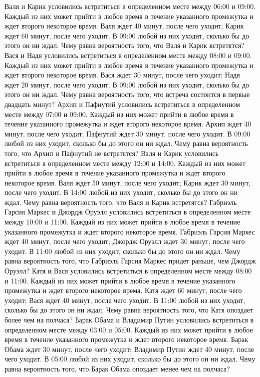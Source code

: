 Валя и Карик условились встретиться в определенном месте между 06:00 и 09:00. Каждый из них может прийти в любое время в течение указанного промежутка и ждет второго некоторое время. Валя ждет 40 минут, после чего уходит; Карик ждет 60 минут, после чего уходит. В 09:00 любой из них уходит, сколько бы до этого он ни ждал. Чему равна вероятность того, что Валя и Карик встретятся?
Вася и Надя условились встретиться в определенном месте между 08:00 и 09:00. Каждый из них может прийти в любое время в течение указанного промежутка и ждет второго некоторое время. Вася ждет 30 минут, после чего уходит; Надя ждет 20 минут, после чего уходит. В 09:00 любой из них уходит, сколько бы до этого он ни ждал. Чему равна вероятность того, что встреча состоится в первые двадцать минут?
Архип и Пафнутий условились встретиться в определенном месте между 07:00 и 09:00. Каждый из них может прийти в любое время в течение указанного промежутка и ждет второго некоторое время. Архип ждет 40 минут, после чего уходит; Пафнутий ждет 30 минут, после чего уходит. В 09:00 любой из них уходит, сколько бы до этого он ни ждал. Чему равна вероятность того, что Архип и Пафнутий не встретятся?
Валя и Карик условились встретиться в определенном месте между 12:00 и 14:00. Каждый из них может прийти в любое время в течение указанного промежутка и ждет второго некоторое время. Валя ждет 50 минут, после чего уходит; Карик ждет 30 минут, после чего уходит. В 14:00 любой из них уходит, сколько бы до этого он ни ждал. Чему равна вероятность того, что Валя и Карик встретятся?
Габриэль Гарсия Маркес и Джордж Оруэлл условились встретиться в определенном месте между 10:00 и 11:00. Каждый из них может прийти в любое время в течение указанного промежутка и ждет второго некоторое время. Габриэль Гарсия Маркес ждет 40 минут, после чего уходит; Джордж Оруэлл ждет 30 минут, после чего уходит. В 11:00 любой из них уходит, сколько бы до этого он ни ждал. Чему равна вероятность того, что Габриэль Гарсия Маркес придет раньше, чем Джордж Оруэлл?
Катя и Вася условились встретиться в определенном месте между 08:00 и 11:00. Каждый из них может прийти в любое время в течение указанного промежутка и ждет второго некоторое время. Катя ждет 60 минут, после чего уходит; Вася ждет 40 минут, после чего уходит. В 11:00 любой из них уходит, сколько бы до этого он ни ждал. Чему равна вероятность того, что Катя опоздает более чем на полчаса?
Барак Обама и Владимир Путин условились встретиться в определенном месте между 03:00 и 05:00. Каждый из них может прийти в любое время в течение указанного промежутка и ждет второго некоторое время. Барак Обама ждет 30 минут, после чего уходит; Владимир Путин ждет 40 минут, после чего уходит. В 05:00 любой из них уходит, сколько бы до этого он ни ждал. Чему равна вероятность того, что Барак Обама опоздает менее чем на полчаса?
